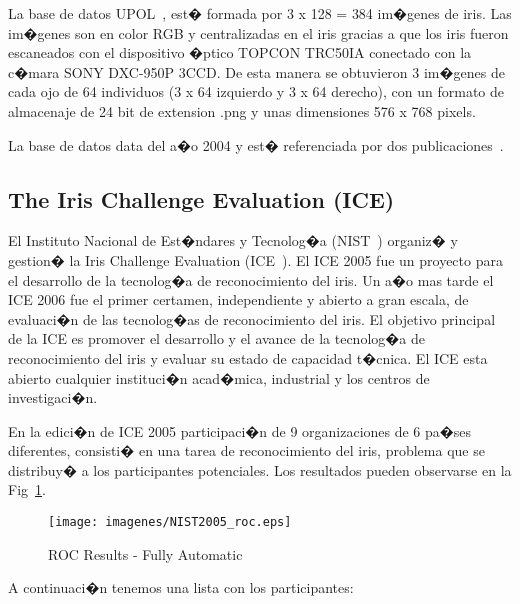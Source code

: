  \label{sec:UPOL_database}

La base de datos UPOL~\cite{database:UPOL}, est� formada por 3 x 128 = 384 im�genes de iris. Las im�genes son en color RGB y centralizadas en el iris gracias a que los iris fueron escaneados con el dispositivo �ptico TOPCON TRC50IA conectado con la c�mara SONY DXC-950P 3CCD. De esta manera se obtuvieron 3 im�genes de cada ojo de 64 individuos (3 x 64 izquierdo y 3 x 64 derecho), con un formato de almacenaje de 24 bit de extension .png y unas dimensiones 576 x 768 pixels.

La base de datos data del a�o 2004 y est� referenciada por dos publicaciones~\cite{article:Dobes04HumanEyeIris,article:Dobes06HumanEyeHough}.

\newpage

\label{sec:competiciones}

\subsection{The Iris Challenge Evaluation (ICE)}
El Instituto Nacional de Est�ndares y Tecnolog�a (NIST~\cite{web:NIST}) organiz� y gestion� la Iris Challenge Evaluation (ICE~\cite{web:ICE}). El ICE 2005 fue un proyecto para el desarrollo de la tecnolog�a de reconocimiento del iris. Un a�o mas tarde el ICE 2006 fue el primer certamen, independiente y abierto a gran escala, de evaluaci�n de las tecnolog�as de reconocimiento del iris. El objetivo principal de la ICE es promover el desarrollo y el avance de la tecnolog�a de reconocimiento del iris y evaluar su estado de capacidad t�cnica. El ICE esta abierto cualquier instituci�n acad�mica, industrial y los centros de investigaci�n.

En la edici�n de ICE 2005 participaci�n de 9 organizaciones de 6 pa�ses diferentes, consisti� en una tarea de reconocimiento del iris, problema que se distribuy� a los participantes potenciales. Los resultados pueden observarse en la Fig~\ref{fig:grafica_ice2005}.

\begin{figure}[h]
  \centerline{
    \mbox{\texttt{[image: imagenes/NIST2005\_roc.eps]}}
  }
  \caption{ROC Results - Fully Automatic}
  \label{fig:grafica_ice2005}
\end{figure}

\noindent A continuaci�n tenemos una lista con los participantes:

